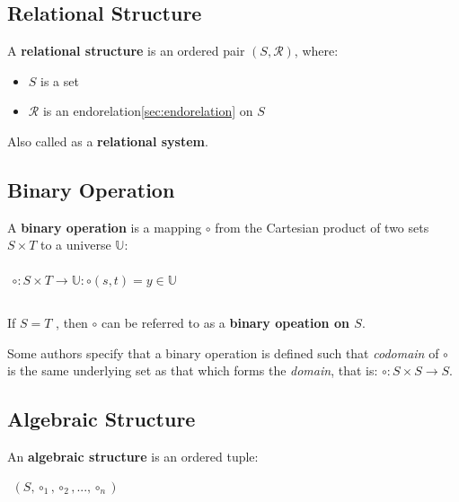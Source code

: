 \subsection{Relational Structure}
\label{sec:relational-structure}

A \textbf{relational structure} is an ordered pair $(S, \mathcal{R})$,
where:

\begin{itemize}
\item $S$ is a set
\item $\mathcal{R}$ is an endorelation\ref{sec:endorelation} on $S$
\end{itemize}

Also called as a \textbf{relational system}.




\subsection{Binary Operation}
\label{sec:binary-operation}

A \textbf{binary operation} is a mapping $\circ$ from the Cartesian
product of two sets $S \times T$ to a universe $\mathbb{U}$:

\begin{math}
  \begin{array}{c}
    \\
    \circ: S \times T \to \mathbb{U} : \circ(s, t) = y \in \mathbb{U} \\
    \\
  \end{array}
\end{math}

If $S = T$ , then $\circ$ can be referred to as a \textbf{binary
  opeation on $S$}.

Some authors specify that a binary operation is defined such that
\textit{codomain} of $\circ$ is the same underlying set as that which
forms the \textit{domain}, that is: $\circ: S \times S \to S$.


\subsection{Algebraic Structure}
\label{sec:algebraic-structure}

An \textbf{algebraic structure} is an ordered tuple:

\begin{math}
  \begin{array}{c}
    (S, \circ_1, \circ_2, ..., \circ_n)
  \end{array}
\end{math}

